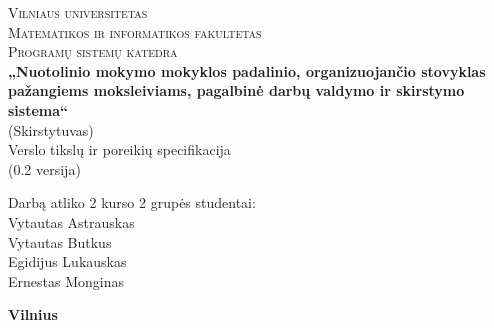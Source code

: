 \begin{titlepage}

  \begin{center}

    \textsc{\Large Vilniaus universitetas\\
    Matematikos ir informatikos fakultetas\\
    Programų sistemų katedra}\\[6.0cm]

    \textbf{ \LARGE „Nuotolinio mokymo mokyklos padalinio, 
    organizuojančio stovyklas pažangiems moksleiviams, pagalbinė darbų 
    valdymo ir skirstymo sistema“ }\\
    { \Large (Skirstytuvas)}\\[0.5cm]

    {\Large Verslo tikslų ir poreikių specifikacija }\\[0.5cm]

    {\Large (0.2 versija)}\\[3.0cm]

    \begin{minipage}[]{0.8\textwidth}
      \begin{flushright} 
        Darbą atliko 2 kurso 2 grupės studentai: \\
        Vytautas Astrauskas \\
        Vytautas Butkus \\
        Egidijus Lukauskas \\
        Ernestas Monginas
      \end{flushright}
    \end{minipage}

    \vfill

    \textbf{\large  Vilnius \\ \the\year }
  \end{center}
  
\end{titlepage}
